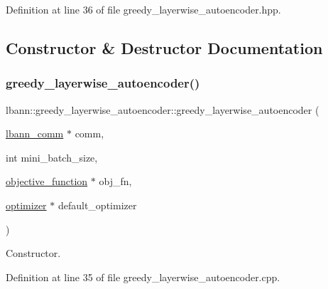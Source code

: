 Definition at line 36 of file greedy\+\_\+layerwise\+\_\+autoencoder.\+hpp.



\subsection{Constructor \& Destructor Documentation}
\mbox{\label{classlbann_1_1greedy__layerwise__autoencoder_a36dff325c3c756623b28cb056f91e058}} 
\subsubsection{\texorpdfstring{greedy\+\_\+layerwise\+\_\+autoencoder()}{greedy\_layerwise\_autoencoder()}\hspace{0.1cm}{\footnotesize\ttfamily [1/2]}}
{\footnotesize\ttfamily lbann\+::greedy\+\_\+layerwise\+\_\+autoencoder\+::greedy\+\_\+layerwise\+\_\+autoencoder (\begin{DoxyParamCaption}\item[{\hyperlink{classlbann_1_1lbann__comm}{lbann\+\_\+comm} $\ast$}]{comm,  }\item[{int}]{mini\+\_\+batch\+\_\+size,  }\item[{\hyperlink{classlbann_1_1objective__function}{objective\+\_\+function} $\ast$}]{obj\+\_\+fn,  }\item[{\hyperlink{classlbann_1_1optimizer}{optimizer} $\ast$}]{default\+\_\+optimizer }\end{DoxyParamCaption})}

Constructor. 

Definition at line 35 of file greedy\+\_\+layerwise\+\_\+autoencoder.\+cpp.


